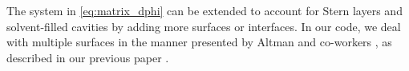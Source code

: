 The system in \eqref{eq:matrix_dphi} can be extended to account for Stern layers and solvent-filled cavities by adding more surfaces or interfaces. In our code, we deal with multiple surfaces in the manner presented by Altman and co-workers \cite{AltmanBardhanWhiteTidor09}, as described in our previous paper \cite{CooperBardhanBarba2013}.



 \begin{comment}
 
Figure \ref{fig:molecule_surface_stern} shows a more interesting situation. There, the surface $\Gamma_3$ has a given potential $\phi_0$ with a Stern layer, and interacts with a molecule that has a pocket of solvent, where the linearized Poisson-Boltzmann equation is enforced. In this case, the derivation that led to Equation \eqref{eq:matrix_phi} yields
 
 \newpage
 

\end{comment}
